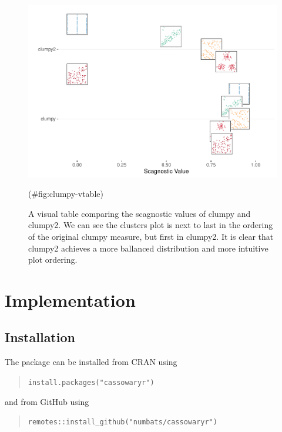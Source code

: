 \begin{Schunk}
\begin{figure}
\includegraphics[width=1\linewidth]{mason-lee-laa-cook_files/figure-latex/clumpy-vtable-1} \caption[A visual table comparing the scagnostic values of clumpy and clumpy2]{A visual table comparing the scagnostic values of clumpy and clumpy2. We can see the clusters plot is next to last in the ordering of the original clumpy measure, but first in clumpy2. It is clear that clumpy2 achieves a more ballanced distribution and more intuitive plot ordering.}(\#fig:clumpy-vtable)
\end{figure}
\end{Schunk}

\hypertarget{implementation}{%
\section{Implementation}\label{implementation}}

\hypertarget{installation}{%
\subsection{Installation}\label{installation}}

The package can be installed from CRAN using

\begin{quote}
\texttt{install.packages("cassowaryr")}
\end{quote}

and from GitHub using

\begin{quote}
\texttt{remotes::install\_github("numbats/cassowaryr")}
\end{quote}

